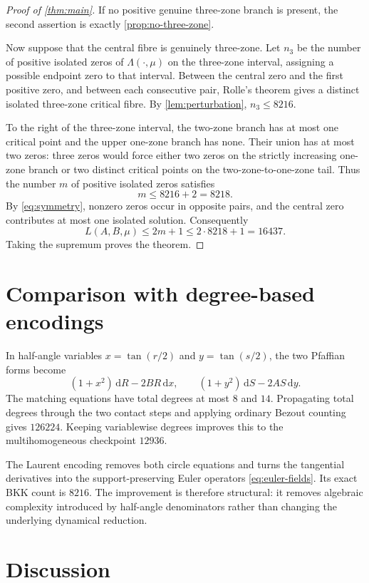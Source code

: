 \documentclass[11pt]{article}
\newcommand{\dd}{\,\mathrm d}
\begin{document}
\begin{proof}[Proof of \cref{thm:main}]
If no positive genuine three-zone branch is present, the second assertion is
exactly \cref{prop:no-three-zone}.

Now suppose that the central fibre is genuinely three-zone.  Let $n_3$ be the number of positive isolated zeros of $\Lambda(\cdot,\mu)$ on the three-zone interval, assigning a possible endpoint zero to that interval.  Between the central zero and the first positive zero, and between each consecutive pair, Rolle's theorem gives a distinct isolated three-zone critical fibre.  By \cref{lem:perturbation}, $n_3\le8216$.

To the right of the three-zone interval, the two-zone branch has at most one critical point and the upper one-zone branch has none.  Their union has at most two zeros: three zeros would force either two zeros on the strictly increasing one-zone branch or two distinct critical points on the two-zone-to-one-zone tail.  Thus the number $m$ of positive isolated zeros satisfies
\[
 m\le8216+2=8218.
\]
By \eqref{eq:symmetry}, nonzero zeros occur in opposite pairs, and the central zero contributes at most one isolated solution.  Consequently
\[
 L(A,B,\mu)\le2m+1\le2\cdot8218+1=16437.
\]
Taking the supremum proves the theorem.
\end{proof}

\section{Comparison with degree-based encodings}\label{sec:comparison}

In half-angle variables $x=\tan(r/2)$ and $y=\tan(s/2)$, the two Pfaffian forms become
\[
 (1+x^2)\dd R-2BR\dd x,
 \qquad
 (1+y^2)\dd S-2AS\dd y.
\]
The matching equations have total degrees at most $8$ and $14$.  Propagating total degrees through the two contact steps and applying ordinary Bezout counting gives $126224$.  Keeping variablewise degrees improves this to the multihomogeneous checkpoint $12936$.

The Laurent encoding removes both circle equations and turns the tangential derivatives into the support-preserving Euler operators \eqref{eq:euler-fields}.  Its exact BKK count is $8216$.  The improvement is therefore structural: it removes algebraic complexity introduced by half-angle denominators rather than changing the underlying dynamical reduction.

\section{Discussion}\label{sec:discussion}
\end{document}
